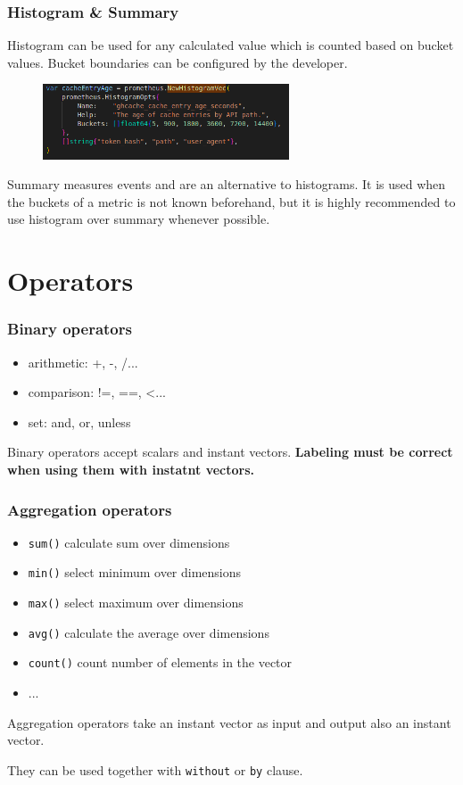 \documentclass[xcolor=dvipsnames]{beamer}
\begin{document}
\begin{frame}
 \frametitle{Histogram \& Summary}
Histogram can be used for any calculated value which is counted based on bucket values. Bucket boundaries can be configured by the developer.
\begin{figure}
\centering
\includegraphics[width=0.65\textwidth]{code.png}

\end{figure}


Summary measures events and are an alternative to histograms.  It is used when the buckets of a metric is not known beforehand, but it is highly recommended to use histogram over summary whenever possible.

\end{frame}


\section{Operators}
\begin{frame}
 \frametitle{Binary operators}
\begin{itemize}
\item arithmetic: +, -, /...
\item comparison: !=, ==, <...
\item set: and, or, unless
\end{itemize}
Binary operators accept scalars and instant vectors. \textbf{Labeling must be correct when using them with instatnt vectors.}
\end{frame}

\begin{frame}
\frametitle{Aggregation operators}
\begin{itemize}
\item \texttt{sum()} calculate sum over dimensions
\item \texttt{min()} select minimum over dimensions
\item \texttt{max()} select maximum over dimensions
\item \texttt{avg()} calculate the average over dimensions
\item \texttt{count()} count number of elements in the vector
\item ...
\end{itemize}
Aggregation operators take an instant vector as input and output also an instant vector.

\vspace{0.1cm}
They can be used together with \texttt{without} or \texttt{by} clause.
\end{frame}
\end{document}
